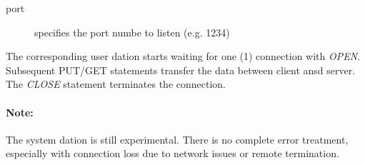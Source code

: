 \begin{description}
\item[port] specifies the port numbe to listen (e.g. 1234)
\end{description}

The corresponding user dation starts waiting for one (1) connection with {\em OPEN}.
Subsequent PUT/GET statements transfer the data between client ansd server.
The {\em CLOSE} statement terminates the connection.

\paragraph{Note:} The system dation is still experimental. 
There is no complete error treatment, especially with connection loss due 
to network issues or remote termination.


